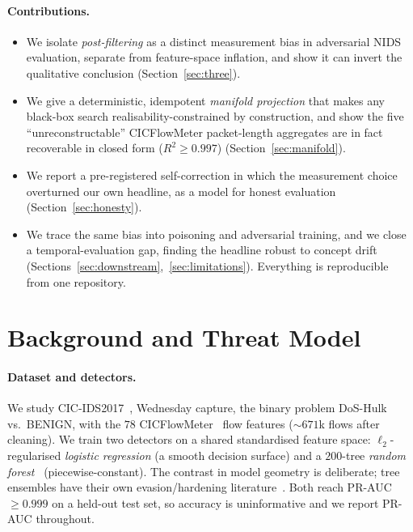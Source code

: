 \documentclass[10pt,twocolumn]{article}
\begin{document}
\paragraph{Contributions.}
\begin{itemize}\itemsep2pt
  \item We isolate \emph{post-filtering} as a distinct measurement bias in
  adversarial NIDS evaluation, separate from feature-space inflation, and show it
  can invert the qualitative conclusion (Section~\ref{sec:three}).
  \item We give a deterministic, idempotent \emph{manifold projection} that makes
  any black-box search realisability-constrained by construction, and show the
  five ``unreconstructable'' CICFlowMeter packet-length aggregates are in fact
  recoverable in closed form ($R^2\!\ge\!0.997$) (Section~\ref{sec:manifold}).
  \item We report a pre-registered self-correction in which the measurement choice
  overturned our own headline, as a model for honest evaluation
  (Section~\ref{sec:honesty}).
  \item We trace the same bias into poisoning and adversarial training, and we
  close a temporal-evaluation gap, finding the headline robust to concept drift
  (Sections~\ref{sec:downstream},~\ref{sec:limitations}). Everything is
  reproducible from one repository.
\end{itemize}

\section{Background and Threat Model}
\label{sec:background}

\paragraph{Dataset and detectors.}
We study CIC-IDS2017~\cite{sharafaldin2018cicids}, Wednesday capture, the binary
problem DoS-Hulk vs.\ BENIGN, with the $78$ CICFlowMeter~\cite{lashkari2017cicflowmeter}
flow features ($\sim$$671$k flows after cleaning). We train two detectors on a
shared standardised feature space: $\ell_2$-regularised \emph{logistic regression}
(a smooth decision surface) and a $200$-tree \emph{random
forest}~\cite{breiman2001randomforests} (piecewise-constant). The contrast in
model geometry is deliberate; tree ensembles have their own evasion/hardening
literature~\cite{kantchelian2016evasion}. Both reach PR-AUC $\ge 0.999$ on a
held-out test set, so accuracy is uninformative and we report PR-AUC throughout.
\end{document}
